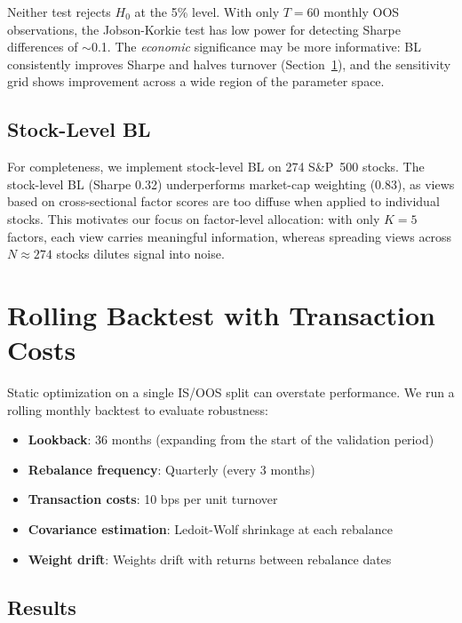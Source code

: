 \documentclass[12pt,a4paper]{article}
\begin{document}
Neither test rejects $H_0$ at the 5\% level. With only $T = 60$ monthly OOS observations, the Jobson-Korkie test has low power for detecting Sharpe differences of $\sim$0.1. The \textit{economic} significance may be more informative: BL consistently improves Sharpe and halves turnover (Section~\ref{sec:backtest}), and the sensitivity grid shows improvement across a wide region of the parameter space.

\subsection{Stock-Level BL}

For completeness, we implement stock-level BL on 274 S\&P~500 stocks. The stock-level BL (Sharpe 0.32) underperforms market-cap weighting (0.83), as views based on cross-sectional factor scores are too diffuse when applied to individual stocks. This motivates our focus on factor-level allocation: with only $K=5$ factors, each view carries meaningful information, whereas spreading views across $N \approx 274$ stocks dilutes signal into noise.

\section{Rolling Backtest with Transaction Costs}
\label{sec:backtest}

Static optimization on a single IS/OOS split can overstate performance. We run a rolling monthly backtest to evaluate robustness:

\begin{itemize}[noitemsep]
    \item \textbf{Lookback}: 36 months (expanding from the start of the validation period)
    \item \textbf{Rebalance frequency}: Quarterly (every 3 months)
    \item \textbf{Transaction costs}: 10 bps per unit turnover
    \item \textbf{Covariance estimation}: Ledoit-Wolf shrinkage at each rebalance
    \item \textbf{Weight drift}: Weights drift with returns between rebalance dates
\end{itemize}

\subsection{Results}
\end{document}
